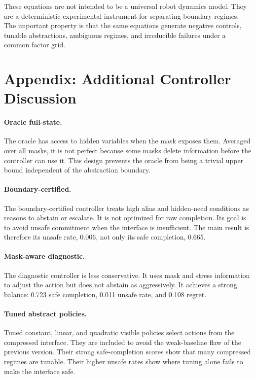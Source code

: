 \documentclass{article}
\begin{document}
These equations are not intended to be a universal robot dynamics model. They
are a deterministic experimental instrument for separating boundary regimes.
The important property is that the same equations generate negative controls,
tunable abstractions, ambiguous regimes, and irreducible failures under a common
factor grid.

\section{Appendix: Additional Controller Discussion}

\paragraph{Oracle full-state.}
The oracle has access to hidden variables when the mask exposes them. Averaged
over all masks, it is not perfect because some masks delete information before
the controller can use it. This design prevents the oracle from being a trivial
upper bound independent of the abstraction boundary.

\paragraph{Boundary-certified.}
The boundary-certified controller treats high alias and hidden-need conditions
as reasons to abstain or escalate. It is not optimized for raw completion. Its
goal is to avoid unsafe commitment when the interface is insufficient. The main
result is therefore its unsafe rate, 0.006, not only its safe completion, 0.665.

\paragraph{Mask-aware diagnostic.}
The diagnostic controller is less conservative. It uses mask and stress
information to adjust the action but does not abstain as aggressively. It
achieves a strong balance: 0.723 safe completion, 0.011 unsafe rate, and 0.108
regret.

\paragraph{Tuned abstract policies.}
Tuned constant, linear, and quadratic visible policies select actions from the
compressed interface. They are included to avoid the weak-baseline flaw of the
previous version. Their strong safe-completion scores show that many compressed
regimes are tunable. Their higher unsafe rates show where tuning alone fails to
make the interface safe.
\end{document}
